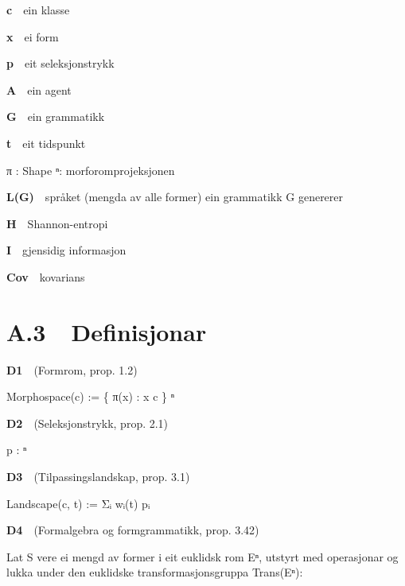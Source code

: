 \documentclass[10pt]{article}
\begin{document}
\noindent\textbf{c}~~ein klasse




\noindent\textbf{x}~~ei form




\noindent\textbf{p}~~eit seleksjonstrykk




\noindent\textbf{A}~~ein agent




\noindent\textbf{G}~~ein grammatikk




\noindent\textbf{t}~~eit tidspunkt


π : Shape  ⁿ: morforomprojeksjonen


\noindent\textbf{L(G)}~~språket (mengda av alle former) ein grammatikk G genererer




\noindent\textbf{H}~~Shannon-entropi




\noindent\textbf{I}~~gjensidig informasjon




\noindent\textbf{Cov}~~kovarians




\section*{A.3~~Definisjonar}





\noindent\textbf{D1}~~(Formrom, prop. 1.2)




Morphospace(c) := \{ π(x) : x  c \}  ⁿ




\noindent\textbf{D2}~~(Seleksjonstrykk, prop. 2.1)




p : ⁿ  




\noindent\textbf{D3}~~(Tilpassingslandskap, prop. 3.1)




Landscape(c, t) := Σᵢ wᵢ(t)  pᵢ




\noindent\textbf{D4}~~(Formalgebra og formgrammatikk, prop. 3.42)




Lat S vere ei mengd av former i eit euklidsk rom Eⁿ, utstyrt med operasjonar og lukka under den euklidske transformasjonsgruppa Trans(Eⁿ):
\end{document}
